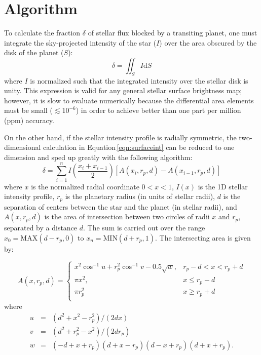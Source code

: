 \documentclass[12pt,preprint]{aastex}
\begin{document}
\section{Algorithm}
\label{section:algorithm}
To calculate the fraction $\delta$ of stellar flux blocked by a transiting planet, one must integrate the sky-projected intensity of the star ($I$) over the area obscured by the disk of the planet ($S$):
\begin{equation}
\delta = \iint_S{I \mathrm{d}S}
\label{eqn:surfaceint}
\end{equation}
where $I$ is normalized such that the integrated intensity over the stellar disk is unity. This expression is valid for any general stellar surface brightness map; however, it is slow to evaluate numerically because the differential area elements must be small ($\lesssim 10^{-6}$) in order to achieve better than one part per million (ppm) accuracy.

On the other hand, if the stellar intensity profile is radially symmetric, the two-dimensional calculation in Equation\,\ref{eqn:surfaceint} can be reduced to one dimension and sped up greatly with the following algorithm: 
\begin{equation}
\delta = \sum_{i=1}^{n} I\left(\frac{x_i+x_{i-1}}{2}\right) \left[A(x_{i}, r_p, d) - A(x_{i-1}, r_p, d)\right]
\end{equation}
where $x$ is the normalized radial coordinate $0 < x < 1$, $I(x)$ is the 1D stellar intensity profile, $r_p$ is the planetary radius (in units of stellar radii), $d$ is the separation of centers between the star and the planet (in stellar radii), and $A(x, r_p, d)$ is the area of intersection between two circles of radii $x$ and $r_p$, separated by a distance $d$.  The sum is carried out over the range $x_0 = \textrm{MAX}(d - r_p, 0)$ to $x_n = \textrm{MIN}(d + r_p, 1)$. The intersecting area is given by:

\begin{equation}
A(x, r_p, d) = 
\begin{cases}
x^2\cos^{-1}{u} + r_p^2\cos^{-1}{v} - 0.5\sqrt{w}, & r_p -d < x < r_p + d\\
\pi x^2, & x \le r_p - d\\
\pi r_p^2 & x \ge r_p +d \\
\end{cases}
\end{equation}
where
\begin{eqnarray}
u &=& (d^2+x^2-r_p^2)/(2dx)\\
v &=& (d^2 + r_p^2 -x^2)/(2dr_p) \\
w &=& (-d+x+r_p)(d+x-r_p)(d-x+r_p)(d+x+r_p).
\end{eqnarray}
\end{document}
